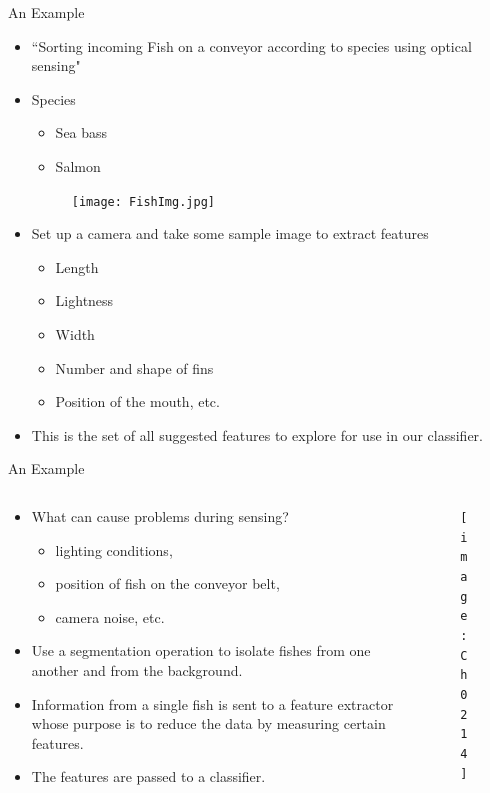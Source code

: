 \begin{frame}{An Example}
\vspace{-4pt}
\begin{itemize}
\item ``Sorting incoming Fish on a conveyor according to species using optical sensing\nocite{duda2012pattern,Omer2018}"
\item Species
\begin{itemize}
\item Sea bass
\item Salmon
\end{itemize}
\begin{figure}
\centering
\texttt{[image: FishImg.jpg]}
\end{figure}
\item Set up a camera and take some sample image to extract features
\begin{itemize}
\item Length
\item Lightness
\item Width
\item Number and shape of fins
\item Position of the mouth, etc.
\end{itemize}
\item This is the set of all suggested features to explore for use in our classifier.
\end{itemize}
\end{frame}

\begin{frame}{An Example}
\begin{columns}
\begin{column}{6cm}
\begin{itemize}
\item What can cause problems during sensing?
\begin{itemize}
\item {\color{mycolor2}lighting conditions}, 
\item position of fish on the conveyor belt, 
\item camera noise, etc.
\end{itemize}
\item Use a segmentation operation to {\color{mycolor2}isolate fishes} from one another and from the {\color{mycolor2}background}.
\item Information from a single fish is sent to a {\color{mycolor1}feature extractor} whose purpose is to reduce the data by measuring certain features.
\item The features are passed to a classifier.
\end{itemize}
\end{column}
\begin{column}{5cm}
\begin{figure}
\texttt{[image: Ch0214]}
\end{figure}
\end{column}
\end{columns}
\end{frame}

